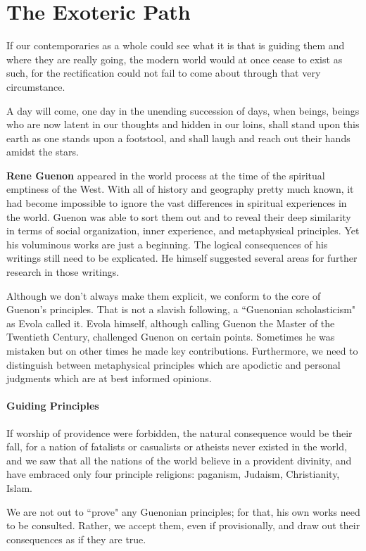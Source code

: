 \section{The Exoteric Path}

\begin{quotex}
If our contemporaries as a whole could see what it is that is guiding them and where they are really going, the modern world would at once cease to exist as such, for the rectification could not fail to come about through that very circumstance. 

A day will come, one day in the unending succession of days, when beings, beings who are now latent in our thoughts and hidden in our loins, shall stand upon this earth as one stands upon a footstool, and shall laugh and reach out their hands amidst the stars. 

\end{quotex}
\textbf{Rene Guenon} appeared in the world process at the time of the spiritual emptiness of the West. With all of history and geography pretty much known, it had become impossible to ignore the vast differences in spiritual experiences in the world. Guenon was able to sort them out and to reveal their deep similarity in terms of social organization, inner experience, and metaphysical principles. Yet his voluminous works are just a beginning. The logical consequences of his writings still need to be explicated. He himself suggested several areas for further research in those writings.

Although we don't always make them explicit, we conform to the core of Guenon's principles. That is not a slavish following, a ``Guenonian scholasticism" as Evola called it. Evola himself, although calling Guenon the Master of the Twentieth Century, challenged Guenon on certain points. Sometimes he was mistaken but on other times he made key contributions. Furthermore, we need to distinguish between metaphysical principles which are apodictic and personal judgments which are at best informed opinions.

\paragraph{Guiding Principles}
\begin{quotex}
If worship of providence were forbidden, the natural consequence would be their fall, for a nation of fatalists or casualists or atheists never existed in the world, and we saw that all the nations of the world believe in a provident divinity, and have embraced only four principle religions: paganism, Judaism, Christianity, Islam. 

\end{quotex}
We are not out to ``prove" any Guenonian principles; for that, his own works need to be consulted. Rather, we accept them, even if provisionally, and draw out their consequences as if they are true.

